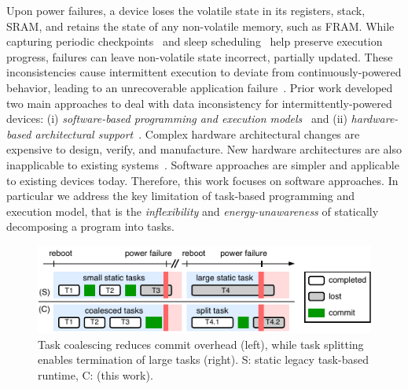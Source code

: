 Upon power failures, a device loses the volatile state in its registers, stack, SRAM, and retains the state of any non-volatile memory, such as FRAM. While capturing periodic checkpoints~\cite{mementos,quickrecall} and sleep scheduling~\cite{dewdrop,hibernus,hibernusplusplus} help preserve execution progress, failures can leave non-volatile state incorrect, partially updated. These inconsistencies cause intermittent execution to deviate from continuously-powered behavior, leading to an unrecoverable application failure~\cite{dino,edb}. Prior work developed two main approaches to deal with data inconsistency for intermittently-powered devices: (i) \emph{software-based programming and execution models}~\cite{dino,ratchet,chain,alpaca} and (ii) \emph{hardware-based architectural support}~\cite{hicks_isca_2017,idetic,nvp}. Complex hardware architectural changes are expensive to design, verify, and manufacture. New hardware architectures are also inapplicable to existing systems~\cite{hicks_isca_2017,nvp}. Software approaches are simpler and applicable to existing devices today. Therefore, this work focuses on software approaches. In particular we address the key limitation of task-based programming and execution model, that is the {\em inflexibility} and \emph{energy-unawareness} of statically decomposing a program into tasks.
%
\begin{figure}
    \centering
    \includegraphics[width=\columnwidth]{figures/intro-figure-v5.pdf}
    \caption{Task coalescing reduces commit overhead (left), while task splitting enables termination of large tasks (right).
    S: static legacy task-based runtime, C: \sys (this work).}
    \label{fig:coalesce}
\end{figure}


